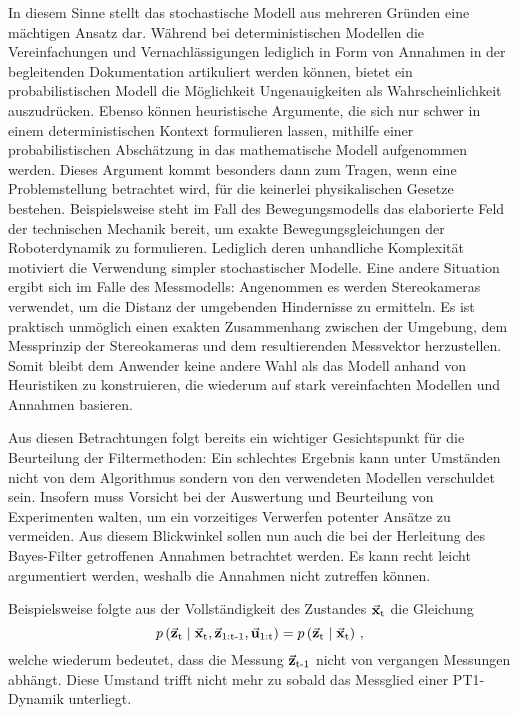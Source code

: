 In diesem Sinne stellt das stochastische Modell aus mehreren Gründen eine mächtigen Ansatz dar. Während bei deterministischen Modellen die Vereinfachungen und Vernachlässigungen lediglich in Form von Annahmen in der begleitenden Dokumentation artikuliert werden können, bietet ein probabilistischen Modell die Möglichkeit Ungenauigkeiten als Wahrscheinlichkeit auszudrücken. Ebenso können heuristische Argumente, die sich nur schwer in einem deterministischen Kontext formulieren lassen, mithilfe einer probabilistischen Abschätzung in das mathematische Modell aufgenommen werden. Dieses Argument kommt besonders dann zum Tragen, wenn eine Problemstellung betrachtet wird, für die keinerlei physikalischen Gesetze bestehen. Beispielsweise steht im Fall des Bewegungsmodells das elaborierte Feld der technischen Mechanik bereit, um exakte Bewegungsgleichungen der Roboterdynamik zu formulieren. Lediglich deren unhandliche Komplexität motiviert die Verwendung simpler stochastischer Modelle. Eine andere Situation ergibt sich im Falle des Messmodells: Angenommen es werden Stereokameras verwendet, um die Distanz der umgebenden Hindernisse zu ermitteln. Es ist praktisch unmöglich einen exakten Zusammenhang zwischen der Umgebung, dem Messprinzip der Stereokameras und dem resultierenden Messvektor herzustellen. Somit bleibt dem Anwender keine andere Wahl als das Modell anhand von Heuristiken zu konstruieren, die wiederum auf stark vereinfachten Modellen und Annahmen basieren. 

Aus diesen Betrachtungen folgt bereits ein wichtiger Gesichtspunkt für die Beurteilung der Filtermethoden: Ein schlechtes Ergebnis kann unter Umständen nicht von dem Algorithmus sondern von den verwendeten Modellen verschuldet sein. Insofern muss Vorsicht bei der Auswertung und Beurteilung von Experimenten walten, um ein vorzeitiges Verwerfen potenter Ansätze zu vermeiden. Aus diesem Blickwinkel sollen nun auch die bei der Herleitung des Bayes-Filter getroffenen Annahmen betrachtet werden. Es kann recht leicht argumentiert werden, weshalb die Annahmen nicht zutreffen können. 

Beispielsweise folgte aus der Vollständigkeit des Zustandes $\vec{\mathbf{x}}_{\text{t}}$ die Gleichung
\begin{equation}
p\left({\vec{\mathbf{z}}_{\text{t}}} \hspace{1mm} \vert \hspace{1mm} {\vec{\mathbf{x}}_{\text{t}},\vec{\mathbf{z}}_{\text{1:t-1}},\vec{\mathbf{u}}_{\text{1:t}}}\right) = p\left({\vec{\mathbf{z}}_{\text{t}}} \hspace{1mm} \vert \hspace{1mm} {\vec{\mathbf{x}}_{\text{t}}}\right)\,,
\end{equation}
welche wiederum bedeutet, dass die Messung $\vec{\mathbf{z}}_{\text{t-1}}$ nicht von vergangen Messungen abhängt. Diese Umstand trifft nicht mehr zu sobald das Messglied einer PT1-Dynamik unterliegt.

